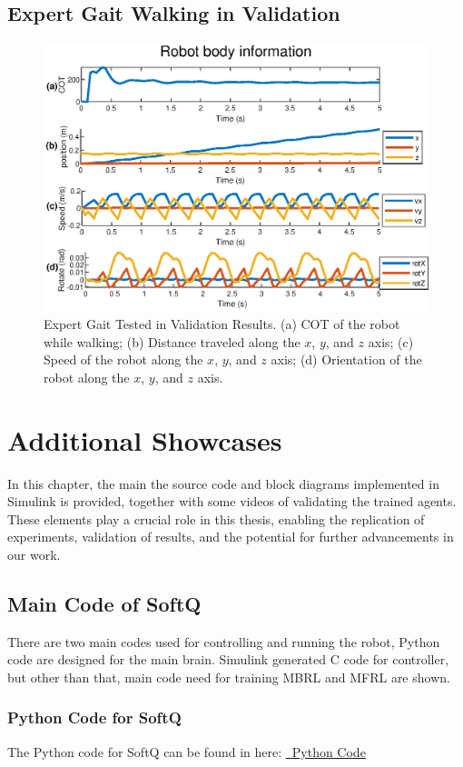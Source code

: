 \section{Expert Gait Walking in Validation}
\begin{figure}[htb]
    \centering
    \includegraphics[width=\linewidth]{img/AppA/expert_val.eps}
    \caption{Expert Gait Tested in Validation Results. (a) COT of the robot while walking; (b) Distance traveled along the $x$, $y$, and $z$ axis; (c) Speed of the robot along the $x$, $y$, and $z$ axis; (d) Orientation of the robot along the $x$, $y$, and $z$ axis.}
    \label{fig:expert_val}
\end{figure}


\chapter{Additional Showcases}
In this chapter, the main the source code and block diagrams implemented in Simulink is provided, together with some videos of validating the trained agents. These elements play a crucial role in this thesis, enabling the replication of experiments, validation of results, and the potential for further advancements in our work.

\section{Main Code of SoftQ}
There are two main codes used for controlling and running the robot, Python code are designed for the main brain. Simulink generated C code for controller, but other than that, main code need for training MBRL and MFRL are shown.
\subsection*{Python Code for SoftQ}
The Python code for SoftQ can be found in here: \href{https://github.com/n7729697/KTH-MasterThesis/blob/main/code/SoftQ_optimized.py}{\faGithub\, \underline{Python Code}}

